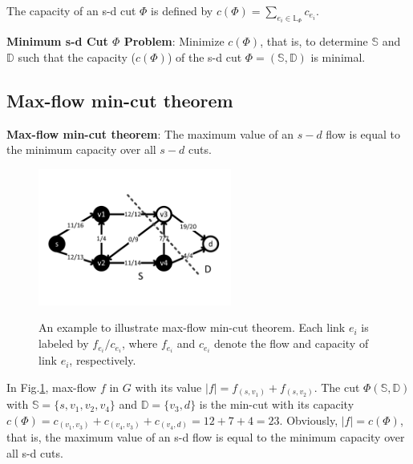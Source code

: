 The capacity of an s-d cut $\Phi$ is defined by $c(\Phi)=\sum\limits_{e_i\in \mathbb{\mathbb{L}}_{\Phi}}c_{e_i}$.

\textbf{Minimum s-d Cut $\Phi$ Problem}: Minimize $c(\Phi)$, that is, to determine $\mathbb{S}$ and $\mathbb{D}$ such that the capacity ($c(\Phi)$) of the s-d cut ${\Phi}=(\mathbb{S},\mathbb{D})$ is minimal.




\subsection{Max-flow min-cut theorem}
\textbf{Max-flow min-cut theorem}: The maximum value of an $s-d$ flow is equal to the minimum capacity over all $s-d$ cuts.
\begin{figure}[tp]
  \centering
  \includegraphics[width=2.5in]{franz//FlowNetwork}\\
  \caption{An example to illustrate max-flow min-cut theorem. Each link $e_i$ is labeled by $f_{e_i}/c_{e_i}$, where $f_{e_i}$ and $c_{e_i}$ denote the flow and capacity of link $e_i$, respectively.   }
  \label{fig:FlowNetwork}
\end{figure}
In Fig.\ref{fig:FlowNetwork}, max-flow $f$ in $G$ with its value $|f|=f_{(s,v_1)}+f_{(s,v_2)}$. The cut $\Phi(\mathbb{S},\mathbb{D})$ with $\mathbb{S}=\{s,v_1,v_2,v_4\}$ and $\mathbb{D}=\{v_3,d\}$ is the min-cut with its capacity $c(\Phi)=c_{(v_1,v_3)}+c_{(v_4,v_3)}+c_{(v_4,d)}=12+7+4=23$. Obviously, $|f|=c(\Phi)$, that is, the maximum value of an s-d flow is equal to the minimum capacity over all s-d cuts.

